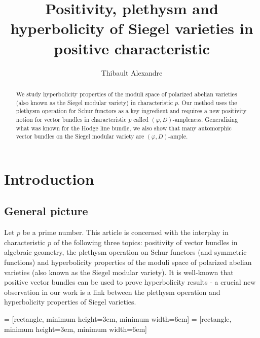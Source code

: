 \documentclass[11pt]{amsart}
\title[Positivity, plethysm and hyperbolicity of Siegel varieties]{Positivity, plethysm and hyperbolicity of Siegel varieties in positive characteristic}
\author{Thibault Alexandre}
\numberwithin{subsection}{section}
\numberwithin{figure}{section}
\numberwithin{table}{section}
\theoremstyle{1}
\theoremstyle{2}
\begin{document}
\begin{abstract}
We study hyperbolicity properties of the moduli space of polarized abelian varieties (also known as the Siegel modular variety) in characteristic $p$. Our method uses the plethysm operation for Schur functors as a key ingredient and requires a new positivity notion for vector bundles in characteristic $p$ called $(\varphi,D)$-ampleness. Generalizing what was known for the Hodge line bundle, we also show that many automorphic vector bundles on the Siegel modular variety are $(\varphi,D)$-ample.
\end{abstract}

\maketitle

\vspace{-1cm}
\tableofcontents
\vspace{0.1cm}
\section{Introduction}
\subsection{General picture}
Let $p$ be a prime number. This article is concerned with the interplay in characteristic $p$ of the following three topics: positivity of vector bundles in algebraic geometry, the plethysm operation on Schur functors (and symmetric functions) and hyperbolicity properties of the moduli space of polarized abelian varieties (also known as the Siegel modular variety). It is well-known that positive vector bundles can be used to prove hyperbolicity results - a crucial new observation in our work is a link between the plethysm operation and hyperbolicity properties of Siegel varieties.
\vspace{0.2cm}

 = [rectangle, minimum height=3em, minimum width=6em]
 = [rectangle, minimum height=3em, minimum width=6em]

\begin{center}
\end{center}
\vspace{0.3cm}
\end{document}
